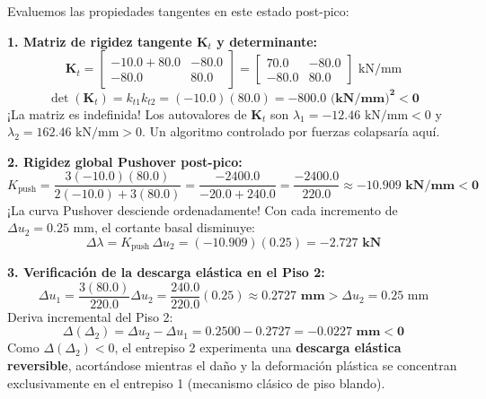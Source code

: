 \documentclass[11pt,letterpaper]{article}
\begin{document}
\begin{alertbox}
Evaluemos las propiedades tangentes en este estado post-pico:

\textbf{1. Matriz de rigidez tangente $\mathbf{K}_t$ y determinante:}
\begin{equation}
    \mathbf{K}_t = 
    \begin{bmatrix}
        -10.0 + 80.0 & -80.0 \\
        -80.0 & 80.0
    \end{bmatrix}
    =
    \begin{bmatrix}
        70.0 & -80.0 \\
        -80.0 & 80.0
    \end{bmatrix}\text{ kN/mm}
\end{equation}
\begin{equation}
    \det(\mathbf{K}_t) = k_{t1} k_{t2} = (-10.0)(80.0) = \mathbf{-800.0\text{ (kN/mm)}^2 < 0}
\end{equation}
¡La matriz es indefinida! Los autovalores de $\mathbf{K}_t$ son $\lambda_1 = -12.46\text{ kN/mm} < 0$ y $\lambda_2 = 162.46\text{ kN/mm} > 0$. Un algoritmo controlado por fuerzas colapsaría aquí.

\vspace{0.2cm}
\textbf{2. Rigidez global Pushover post-pico:}
\begin{equation}
    K_{\text{push}} = \frac{3(-10.0)(80.0)}{2(-10.0) + 3(80.0)} = \frac{-2400.0}{-20.0 + 240.0} = \frac{-2400.0}{220.0} \approx \mathbf{-10.909\text{ kN/mm} < 0}
\end{equation}
¡La curva Pushover desciende ordenadamente! Con cada incremento de $\Delta u_2 = 0.25\text{ mm}$, el cortante basal disminuye:
\begin{equation}
    \Delta \lambda = K_{\text{push}} \, \Delta u_2 = (-10.909)(0.25) = \mathbf{-2.727\text{ kN}}
\end{equation}

\vspace{0.2cm}
\textbf{3. Verificación de la descarga elástica en el Piso 2:}
\begin{equation}
    \Delta u_1 = \frac{3(80.0)}{220.0} \Delta u_2 = \frac{240.0}{220.0}(0.25) \approx \mathbf{0.2727\text{ mm}} > \Delta u_2 = 0.25\text{ mm}
\end{equation}
Deriva incremental del Piso 2:
\begin{equation}
    \Delta(\Delta_2) = \Delta u_2 - \Delta u_1 = 0.2500 - 0.2727 = \mathbf{-0.0227\text{ mm} < 0}
\end{equation}
Como $\Delta(\Delta_2) < 0$, el entrepiso 2 experimenta una \textbf{descarga elástica reversible}, acortándose mientras el daño y la deformación plástica se concentran exclusivamente en el entrepiso 1 (mecanismo clásico de piso blando).
\end{alertbox}
\end{document}
